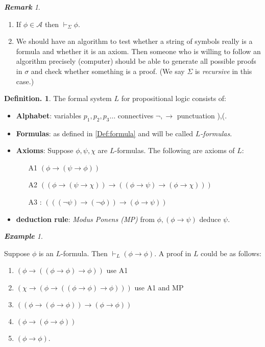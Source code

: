 \documentclass[a4paper,oneside,11pt,DIV=12,parskip=half]{scrartcl}
\theoremstyle{plain}
\theoremstyle{definition}
\newtheorem{definition}[theorem]{Definition.}
\newtheorem{remark, definition}[theorem]{Remark and Definition.}
\newtheorem{lemma, definition}[theorem]{Lemma and Definition.}
\newtheorem{theorem, definition}[theorem]{Theorem and Definition.}
\theoremstyle{remark}
\newtheorem*{remark}{\textbf{Remark}}
\newtheorem*{example}{\textbf{Example}}
\newtheorem*{remark, example}{\textbf{Remark and Exercise}}
\begin{document}
\begin{remark}
\begin{enumerate}
    \item If $\phi \in \mathcal{A}$ then $\vdash_\Sigma \phi$.
    \item We should have an algorithm to test whether a string of symbols really is a formula and whether it is an axiom. Then someone who is willing to follow an algorithm precisely (computer) should be able to generate all possible proofs in $\sigma$ and check whether something is a proof. (We say $\Sigma$ is \emph{recursive} in this case.)
\end{enumerate}
\end{remark}

\begin{definition}
The formal system $L$ for propositional logic consists of:

\begin{itemize}
    \item \textbf{Alphabet}: variables $p_1,p_2,p_3\dots$  connectives $\lnot,\rightarrow$
    punctuation ),(.
    \item \textbf{Formulas}: as defined in \ref{Def:formula} and will be called \emph{$L$-formulas}.
    \item \textbf{Axioms}: Suppose $\phi,\psi,\chi$ are $L$-formulas. The following are axioms of $L$:
    \begin{itemize}
        \item[A1] $(\phi \rightarrow (\psi \rightarrow \phi))$
        \item[A2] $((\phi \rightarrow (\psi \rightarrow \chi)) \rightarrow ((\phi \rightarrow \psi) \rightarrow (\phi \rightarrow \chi)))$
        \item[A3]: $(((\lnot \psi) \rightarrow ( \lnot \phi)) \rightarrow (\phi \rightarrow \psi))$
    \end{itemize}
    \item \textbf{deduction rule}: \emph{ Modus Ponens (MP)} from $\phi,  (\phi \rightarrow \psi)$ deduce $\psi$.
\end{itemize}

\begin{example} \label{rem:phi_implies_phi}

Suppose $\phi$ is an $L$-formula. Then $\vdash_L (\phi \rightarrow \phi)$.
A proof in $L$ could be as follows:
\begin{enumerate}
    \item $(\phi \rightarrow ((\phi \rightarrow \phi) \rightarrow \phi))$ use A1
    \item $(\chi \rightarrow (\phi \rightarrow ((\phi \rightarrow \phi) \rightarrow \phi)))$ use A1 and MP
    \item $((\phi \rightarrow (\phi \rightarrow \phi)) \rightarrow (\phi \rightarrow \phi))$
    \item $(\phi \rightarrow (\phi \rightarrow \phi))$
    \item $(\phi \rightarrow \phi)$.
\end{enumerate}
\end{example}
\end{definition}
\end{document}
